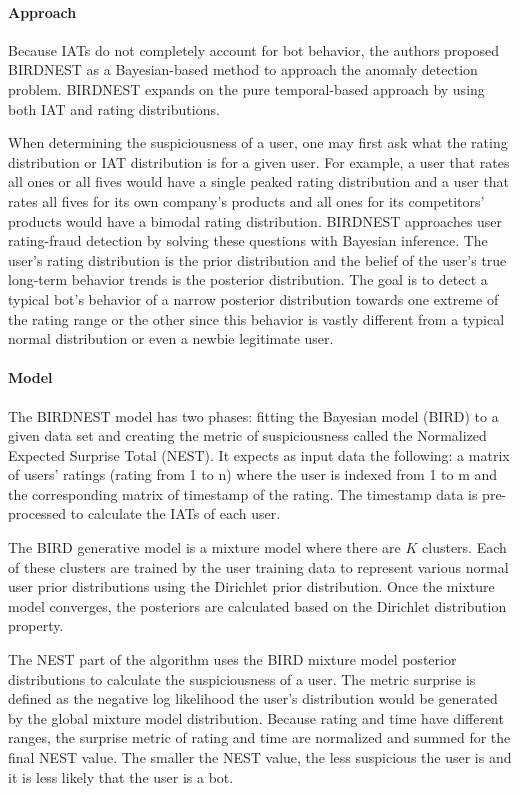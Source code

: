 \documentclass[11pt, oneside]{article}   	%
\begin{document}
\paragraph*{Approach}
\quad

\quad Because IATs do not completely account for bot behavior, the authors proposed BIRDNEST \cite{birdnest} as a Bayesian-based method to approach the anomaly detection problem. 
BIRDNEST expands on the pure temporal-based approach by using both IAT and rating distributions.

\quad When determining the suspiciousness of a user, one may first ask what the rating distribution or IAT distribution is for a given user.
For example, a user that rates all ones or all fives would have a single peaked rating distribution and a user that rates all fives for its own company's products and all ones for its competitors' products would have a bimodal rating distribution.
BIRDNEST approaches user rating-fraud detection by solving these questions with Bayesian inference.
The user's rating distribution is the prior distribution and the belief of the user's true long-term behavior trends is the posterior distribution.
The goal is to detect a typical bot's behavior of a narrow posterior distribution towards one extreme of the rating range or the other since this behavior is vastly different from a typical normal distribution or even a newbie legitimate user.

\paragraph*{Model}
\quad

\quad The BIRDNEST model has two phases: fitting the Bayesian model (BIRD) to a given data set and creating the metric of suspiciousness called the Normalized Expected Surprise Total (NEST).
It expects as input data the following: a matrix of users' ratings (rating from 1 to n) where the user is indexed from 1 to m and the corresponding matrix of timestamp of the rating.
The timestamp data is pre-processed to calculate the IATs of each user.

\quad The BIRD generative model is a mixture model where there are $K$ clusters.
Each of these clusters are trained by the user training data to represent various normal user prior distributions using the Dirichlet prior distribution.
Once the mixture model converges, the posteriors are calculated based on the Dirichlet distribution property.

\quad The NEST part of the algorithm uses the BIRD mixture model posterior distributions to calculate the suspiciousness of a user.
The metric surprise is defined as the negative log likelihood the user's distribution would be generated by the global mixture model distribution.
Because rating and time have different ranges, the surprise metric of rating and time are normalized and summed for the final NEST value.
The smaller the NEST value, the less suspicious the user is and it is less likely that the user is a bot.
\end{document}
